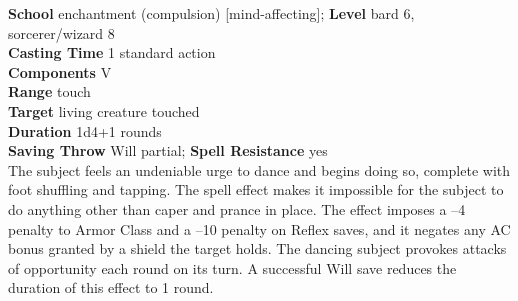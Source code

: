 \textbf{School} enchantment (compulsion) [mind-affecting]; \textbf{Level} bard 6, sorcerer/wizard 8\\
\textbf{Casting Time} 1 standard action\\
\textbf{Components} V\\
\textbf{Range} touch\\
\textbf{Target} living creature touched\\
\textbf{Duration} 1d4+1 rounds\\
\textbf{Saving Throw} Will partial; \textbf{Spell Resistance} yes\\
The subject feels an undeniable urge to dance and begins doing so, complete with foot shuffling and tapping. The spell effect makes it impossible for the subject to do anything other than caper and prance in place. The effect imposes a –4 penalty to Armor Class and a –10 penalty on Reflex saves, and it negates any AC bonus granted by a shield the target holds. The dancing subject provokes attacks of opportunity each round on its turn. A successful Will save reduces the duration of this effect to 1 round.\\

